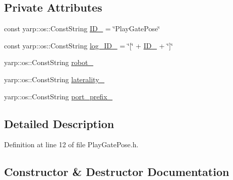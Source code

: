 \subsection*{Private Attributes}
\begin{DoxyCompactItemize}
\item 
const yarp\+::os\+::\+Const\+String \hyperlink{classPlayGatePose_a8700d03eb31893c2dd629b6428edcf8f}{I\+D\+\_\+} = \char`\"{}Play\+Gate\+Pose\char`\"{}
\item 
const yarp\+::os\+::\+Const\+String \hyperlink{classPlayGatePose_a45dc28ee85b9ea1d885d0a62f5dc4d81}{log\+\_\+\+I\+D\+\_\+} = \char`\"{}\mbox{[}\char`\"{} + \hyperlink{classPlayGatePose_a8700d03eb31893c2dd629b6428edcf8f}{I\+D\+\_\+} + \char`\"{}\mbox{]}\char`\"{}
\item 
yarp\+::os\+::\+Const\+String \hyperlink{classPlayGatePose_aa4015d529ba3c0cb9306e2c67cec3bb2}{robot\+\_\+}
\item 
yarp\+::os\+::\+Const\+String \hyperlink{classPlayGatePose_aed3a573d0e4a96673e49066dff1526e3}{laterality\+\_\+}
\item 
yarp\+::os\+::\+Const\+String \hyperlink{classPlayGatePose_a14886233558f20f775b6fbb523f14566}{port\+\_\+prefix\+\_\+}
\end{DoxyCompactItemize}


\subsection{Detailed Description}


Definition at line 12 of file Play\+Gate\+Pose.\+h.



\subsection{Constructor \& Destructor Documentation}
\mbox{\label{classPlayGatePose_a134d268932fcced2e6d6cc1a800cf7e9}} 
